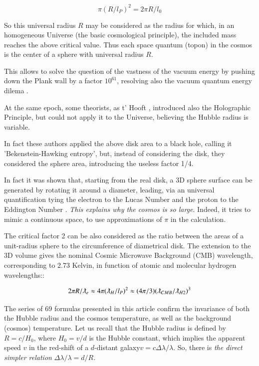 \documentclass[a4paper,9pt]{article}
\begin{document}
    \begin{equation}
        \pi (R/l_P)^2 = 2\pi R/l_0
    \end{equation}
    
    So this universal radius $R$ may be considered as the radius for which, in an homogeneous Universe (the basic cosmological principle), the included mass reaches the above critical value\cite{Sanchez}. Thus each space quantum (topon) in the cosmos is the center of a sphere with universal radius $R$.  
    
    
    This allows to solve the question of the vastness of the vacuum energy by pushing down the Plank wall by a factor $10^61$, resolving also the vacuum quantum energy dilema  \cite{Sanchez} . 
    
    
    At the same epoch, some theorists, as t' Hooft \cite{Hooft}, introduced also the Holographic Principle, but could not apply it to the Universe, believing the Hubble radius is variable.
    
    
    In fact these authors applied the above disk area to a black hole, calling it 'Bekenstein-Hawking entropy'\cite{Bekenstein}, but, instead of considering the disk, they considered the sphere area, introducing the useless factor 1/4. 
    
    
    In fact it was shown that, starting from the real disk, a 3D sphere surface can be generated by rotating it around a diameter, leading, via an universal quantification tying the electron to the Lucas Number and the proton to the Eddington Number \cite{Sanchez}. \textit {This explains why the cosmos is so large}. Indeed, it tries to mimic a continuous space, to use approximations of $\pi$ in  the calculation.
    
    
    The critical factor 2 can be also considered as the ratio between the areas of a unit-radius sphere to the circumference of diametrical disk. The extension to the 3D volume gives the nominal Cosmic Microwave Background (CMB) wavelength, corresponding to 2.73 Kelvin, in function of atomic and molecular hydrogen wavelengths:\cite{Sanchez}:
    
    \begin{equation}
        2\pi R/\lambdabar_e \approx 4\pi (\lambdabar_H/l_P)^2 \approx (4\pi/3) (\lambdabar_{CMB}/\lambdabar_{H2})^3
    \end{equation}

    The series of 69 formulas presented in this article confirm the invariance of both the Hubble radius and the cosmos temperature, as well as the background (cosmos) temperature. Let us recall that the Hubble radius is defined by $R = c/H_0$, where $H_0 = v/d$ is the Hubble constant, which implies the apparent speed $v$ in the red-shift of a $d$-distant galaxy$ v = c \Delta \lambda/\lambda$. So, there is \textit {the direct simpler relation} $\Delta \lambda/\lambda =  d/R$. 
    
\end{document}
